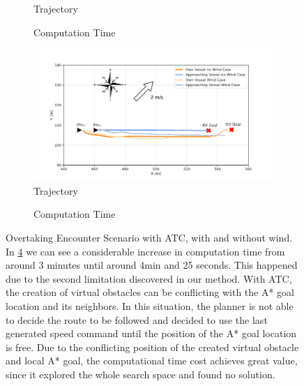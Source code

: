         \begin{figure}[H]
        \centering
        
            \begin{subfigure}[b]{0.49\textwidth}
                \centering
                
                \caption{Trajectory}
                \label{fig:plot_ov_w_vs_wo}
            \end{subfigure}
            \begin{subfigure}[b]{0.49\textwidth}
                \centering
                
                \caption{Computation Time}
                \label{fig:plot_ov_w_vs_wo_CT}
            \end{subfigure}
            
            \begin{subfigure}[b]{0.49\textwidth}
                \centering
                \includegraphics[width=\textwidth]{figs/Chap5/plot_ov_w_vs_wind.pdf}
                \caption{Trajectory}
                \label{fig:plot_ov_w_vs_wind}
            \end{subfigure}
            \begin{subfigure}[b]{0.49\textwidth}
                \centering
                
                \caption{Computation Time}
                \label{fig:plot_ov_w_vs_wind_CT}
            \end{subfigure}
        
        \caption{Overtaking Encounter Scenario with \ac{ATC}, with and without wind. In \ref{fig:plot_ov_w_vs_wind_CT} we can see a considerable increase in computation time from around 3 minutes until around 4min and 25 seconds. This happened due to the second limitation discovered in our method. With \ac{ATC}, the creation of virtual obstacles can be conflicting with the A* goal location and its neighbors. In this situation, the planner is not able to decide the route to be followed and decided to use the last generated speed command until the position of the A* goal location is free. Due to the conflicting position of the created virtual obstacle and local A* goal, the computational time cost achieves great value, since it explored the whole search space and found no solution.}
        \label{fig:plots_ov}
        \end{figure}
        
